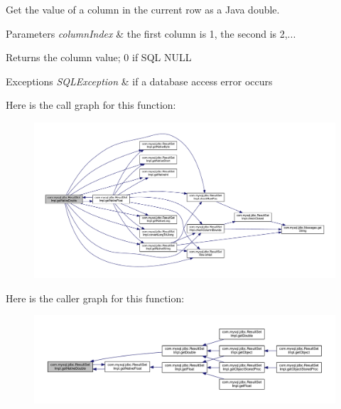 Get the value of a column in the current row as a Java double.


\begin{DoxyParams}{Parameters}
{\em column\+Index} & the first column is 1, the second is 2,...\\
\hline
\end{DoxyParams}
\begin{DoxyReturn}{Returns}
the column value; 0 if S\+QL N\+U\+LL
\end{DoxyReturn}

\begin{DoxyExceptions}{Exceptions}
{\em S\+Q\+L\+Exception} & if a database access error occurs \\
\hline
\end{DoxyExceptions}
Here is the call graph for this function\+:
\nopagebreak
\begin{figure}[H]
\begin{center}
\leavevmode
\includegraphics[width=350pt]{classcom_1_1mysql_1_1jdbc_1_1_result_set_impl_a99d94cf449e766d45479290479c57756_cgraph}
\end{center}
\end{figure}
Here is the caller graph for this function\+:
\nopagebreak
\begin{figure}[H]
\begin{center}
\leavevmode
\includegraphics[width=350pt]{classcom_1_1mysql_1_1jdbc_1_1_result_set_impl_a99d94cf449e766d45479290479c57756_icgraph}
\end{center}
\end{figure}
\mbox{\label{classcom_1_1mysql_1_1jdbc_1_1_result_set_impl_ab7767239a1beed604ab40849316407c0}} 
